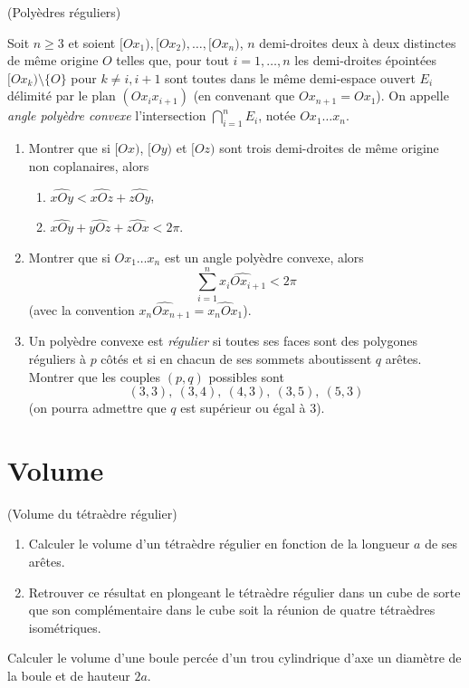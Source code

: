 \documentclass[a4paper,11pt,reqno]{amsart}
\begin{document}
\begin{exo} (Polyèdres réguliers)

Soit $n \geqslant 3$ et soient $[Ox_1),[Ox_2),\ldots,[Ox_n)$, $n$ demi-droites deux à deux distinctes de même origine $O$ telles que, pour tout $i=1,\ldots,n$ les demi-droites épointées $[Ox_k)\setminus\{O\}$ pour $k \neq i,i+1$ sont toutes dans le même demi-espace ouvert $E_i$ délimité par le plan $(Ox_ix_{i+1})$ (en convenant que $Ox_{n+1}=Ox_1$). On appelle \emph{angle polyèdre convexe} l'intersection $\bigcap_{i=1}^n E_i$, notée $Ox_1\ldots x_n$.
  \begin{enumerate}
    \item Montrer que si $[Ox)$, $[Oy)$ et $[Oz)$ sont trois demi-droites de même origine non coplanaires, alors
    \begin{enumerate}
      \item $\widehat{xOy} < \widehat{xOz} + \widehat{zOy}$,
      \item $\widehat{xOy} +\widehat{yOz}+\widehat{zOx} < 2\pi$.
    \end{enumerate}
    \item Montrer que si $Ox_1\ldots x_n$ est un angle polyèdre convexe, alors
      $$
        \sum_{i=1}^n \widehat{x_i O x_{i+1}} < 2 \pi
      $$
      (avec la convention $\widehat{x_nOx_{n+1}}=\widehat{x_nOx_1}$).
    \item Un polyèdre convexe est \emph{régulier} si toutes ses faces sont des polygones réguliers à $p$ côtés et si en chacun de ses sommets aboutissent $q$ arêtes. Montrer que les couples $(p,q)$ possibles sont
      $$
        (3,3),\ (3,4),\ (4,3),\ (3,5),\ (5,3)
      $$
      (on pourra admettre que $q$ est supérieur ou égal à $3$).
  \end{enumerate}
\end{exo}


\section{Volume}

\begin{exo} (Volume du tétraèdre régulier)

  \begin{enumerate}
    \item Calculer le volume d'un tétraèdre régulier en fonction de la longueur $a$ de ses arêtes.
    \item Retrouver ce résultat en plongeant le tétraèdre régulier dans un cube de sorte que son complémentaire dans le cube soit la réunion de quatre tétraèdres isométriques.
  \end{enumerate}
\end{exo}

\begin{exo}[.7]

  Calculer le volume d'une boule percée d'un trou cylindrique d'axe un diamètre de la boule et de hauteur $2a$.
\end{exo}
\end{document}
